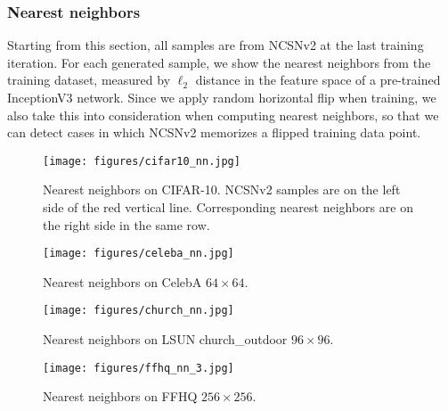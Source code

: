 \documentclass{article}
\begin{document}
\subsubsection{Nearest neighbors}
Starting from this section, all samples are from NCSNv2 at the last training iteration. For each generated sample, we show the nearest neighbors from the training dataset, measured by $\ell_2$ distance in the feature space of a pre-trained InceptionV3 network. Since we apply random horizontal flip when training, we also take this into consideration when computing nearest neighbors, so that we can detect cases in which NCSNv2 memorizes a flipped training data point.
\begin{figure}[H]
    \centering
    \texttt{[image: figures/cifar10\_nn.jpg]}
    \caption{Nearest neighbors on CIFAR-10. NCSNv2 samples are on the left side of the red vertical line. Corresponding nearest neighbors are on the right side in the same row.}
    \label{fig:cifar10_nn}
\end{figure}

\begin{figure}[H]
    \centering
    \texttt{[image: figures/celeba\_nn.jpg]}
    \caption{Nearest neighbors on CelebA $64\times 64$.}
    \label{fig:celeba_nn}
\end{figure}\begin{figure}[H]
    \centering
    \texttt{[image: figures/church\_nn.jpg]}
    \caption{Nearest neighbors on LSUN church\_outdoor $96\times 96$.} \label{fig:church_nn}
\end{figure}\begin{figure}[H]
    \centering
    \texttt{[image: figures/ffhq\_nn\_3.jpg]}
    \caption{Nearest neighbors on FFHQ $256\times 256$.} \label{fig:church_nn}
\end{figure}

\newpage
\end{document}
